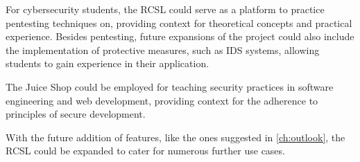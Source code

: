 For cybersecurity students, the RCSL could serve as a platform to practice pentesting techniques on, providing context for theoretical concepts and practical experience.
Besides pentesting, future expansions of the project could also include the implementation of protective measures, such as IDS systems, allowing students to gain experience in their application.

The Juice Shop could be employed for teaching security practices in software engineering and web development, providing context for the adherence to principles of secure development.

With the future addition of features, like the ones suggested in \cref{ch:outlook}, the RCSL could be expanded to cater for numerous further use cases.